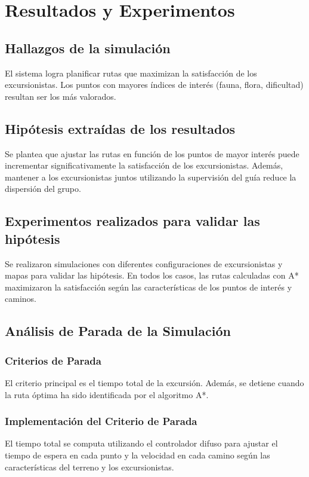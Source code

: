 \documentclass[10pt,twocolumn]{article}
\begin{document}
	\section{Resultados y Experimentos}
	
	\subsection{Hallazgos de la simulación}
	El sistema logra planificar rutas que maximizan la satisfacción de los excursionistas. Los puntos con mayores índices de interés (fauna, flora, dificultad) resultan ser los más valorados.
	
	\subsection{Hipótesis extraídas de los resultados}
	Se plantea que ajustar las rutas en función de los puntos de mayor interés puede incrementar significativamente la satisfacción de los excursionistas. Además, mantener a los excursionistas juntos utilizando la supervisión del guía reduce la dispersión del grupo.
	
	\subsection{Experimentos realizados para validar las hipótesis}
	Se realizaron simulaciones con diferentes configuraciones de excursionistas y mapas para validar las hipótesis. En todos los casos, las rutas calculadas con A* maximizaron la satisfacción según las características de los puntos de interés y caminos.
	
	\subsection{Análisis de Parada de la Simulación}
	
	\subsubsection{Criterios de Parada}
	El criterio principal es el tiempo total de la excursión. Además, se detiene cuando la ruta óptima ha sido identificada por el algoritmo A*.
	
	\subsubsection{Implementación del Criterio de Parada}
	El tiempo total se computa utilizando el controlador difuso para ajustar el tiempo de espera en cada punto y la velocidad en cada camino según las características del terreno y los excursionistas.
	
\end{document}
